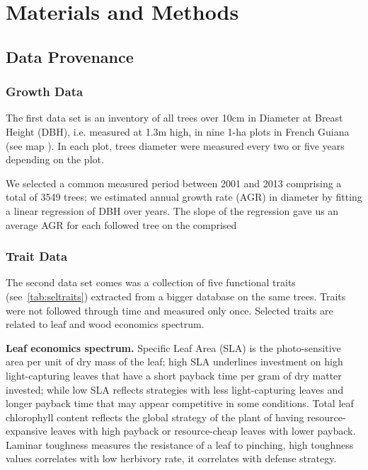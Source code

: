 \section*{Materials and Methods}
\label{sec:M&M}

\subsection*{Data Provenance}

\subsubsection*{Growth Data}
The first data set is an inventory of all trees over 10cm in Diameter at Breast Height (DBH), i.e. measured at 1.3m high, in nine 1-ha plots in French Guiana (see map \missfig). In each plot, trees diameter were measured every two or five years depending on the plot.

We selected a common measured period between 2001 and 2013 comprising a total of 3549 trees; we estimated annual growth rate (AGR) in diameter by fitting a linear regression of DBH over years. The slope of the regression gave us an average AGR for each followed tree on the comprised 


\subsubsection*{Trait Data}

The second data set comes was a collection of five functional traits (see~\autoref{tab:seltraits}) extracted from a bigger database \citep{baraloto_decoupled_2010} on the same trees. Traits were not followed through time and measured only once. Selected traits are related to leaf and wood economics spectrum\citep{westoby_leaf-height-seed_1998, baraloto_decoupled_2010}.

\textbf{Leaf economics spectrum.} Specific Leaf Area (SLA) is the photo-sensitive area per unit of dry mass of the leaf; high SLA underlines investment on high light-capturing leaves that have a short payback time per gram of dry matter invested; while low SLA reflects strategies with less light-capturing leaves and longer payback time that may appear competitive in some conditions. Total leaf chlorophyll content reflects the global strategy of the plant of having resource-expansive leaves with high payback or resource-cheap leaves with lower payback. Laminar toughness measures the resistance of a leaf to pinching, high toughness values correlates with low herbivory rate, it correlates with defense strategy.

